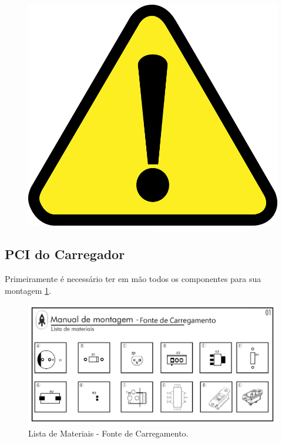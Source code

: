 \begin{figure}[H]
  \centering
  \includegraphics[scale = 0.15]{Figuras/atenção.png}
\end{figure}


\subsection{PCI do Carregador}
\par Primeiramente é necessário ter em mão todos os componentes para sua montagem \ref{carregador01}.

\begin{figure}[H]
  \centering
  \includegraphics[width=\textwidth]{Figuras/Carregador/carregador_manual_01.jpg}
  \caption{Lista de Materiais - Fonte de Carregamento.} 
  \label{carregador01}
\end{figure}

